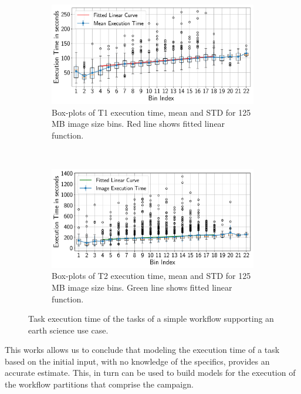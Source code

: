 \begin{figure}[ht!]
    \centering
    \begin{subfigure}[b]{0.45\textwidth}
        \includegraphics[width=\linewidth]{figures/stage_0_tx_box.pdf}
        \caption{Box-plots of T1 execution time, mean and STD for 125 MB image 
        size bins. Red line shows fitted linear function.}
    \end{subfigure}%
    ~ 
    \begin{subfigure}[b]{0.45\textwidth}
        \includegraphics[width=\linewidth]{figures/stage_1_tx_box.pdf}
        \caption{Box-plots of T2 execution time, mean and STD for 125 MB image 
        size bins. Green line shows fitted linear function.}
    \end{subfigure}
    \caption{Task execution time of the tasks of a simple workflow supporting an 
    earth science use case.}
    \label{fig:sealfitting}
\end{figure}

This works allows us to conclude that modeling the execution time of a task 
based on the initial input, with no knowledge of the specifics, provides an 
accurate estimate. This, in turn can be used to build models for the execution 
of the workflow partitions that comprise the campaign.
